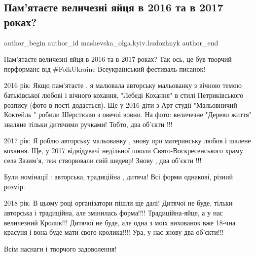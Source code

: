  
 
 
 
 

\subsection{Пам'ятаєте величезні яйця в 2016 та в 2017 роках?}
\label{sec:10_03_2018.fb.mashevska_olga.kyiv.hudozhnyk.1.pamjatajete_velychezni_pysanky_2016_2017}

\ifcmt
 author_begin
   author_id mashevska_olga.kyiv.hudozhnyk
 author_end
\fi

Пам'ятаєте величезні яйця в 2016 та в 2017 роках? Так ось, це був творчий
перформанс від \#FolkUkraine Всеукраїнський фестиваль писанок! 

2016 рік: Якщо пам'ятаєте , я малювала авторську мальованку з вічною темою
батьківської любові і вічного кохання, "Лебеді Кохання" в стилі Петриківського
розпису (фото в пості додається). Ще у 2016 діти з Арт студії "Мальовничий
Коктейль " робили Шерстюлю  з овечоі вовни. На фото: величезне "Дерево життя"
зваляне тільки дитячими ручками! Тобто, два об'єкти !!!

2017 рік: Я роблю авторську мальованку , знову про материнську любов і шалене
кохання. Ще, у 2017 відвідувачі недільної школи Свято-Воскресенського храму
села Зазим'я, теж створювали свій шедевр!  Знову , два об'єкти !!!

Були номінації : авторська, традиційна , дитяча! Всі форми однакові, різний
розмір.

2018 рік: В цьому році організатори пішли ще далі! Дитячої не буде, тільки
авторська і традиційна, але змінилась форма!!!! Традиційна-яйце, а у нас
величезний Кролик!!! Дитячої не буде, але одна з моїх вихованок вже 18-чна
красуня і вона буде мати свого кролика!!!! Ура, у нас знову два об'єкти!!!

Всім наснаги і творчого задоволення!

